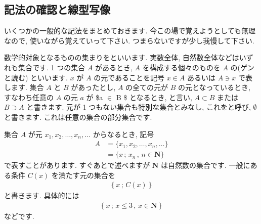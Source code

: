 \documentclass[openany, a4paper, oneside]{book}
\theoremstyle{break}
\theoremstyle{breakdefn}
\begin{document}
\subsection{記法の確認と線型写像}
\label{sec-4-3-2-2}

いくつかの一般的な記法をまとめておきます.
今この場で覚えようとしても無理なので, 使いながら覚えていって下さい.
つまらないですが少し我慢して下さい.

数学的対象となるものの集まりをといいます.
実数全体, 自然数全体などはいずれも集合です. 1 つの集合 $A$ があるとき,
 $A$ を構成する個々のものを $A$ の(ゲンと読む) といいます.
 $x$ が $A$ の元であることを記号 $x\in A$ あるいは $A\ni x$ で表します.
集合 $A$ と $B$ があったとし,  $A$ の全ての元が $B$ の元となっているとき, すなわち任意の $A$ の元 $a$ が \$a $\in$ B \$ となるとき,
と言い,  $A \subset B$ または $B\supset A$ と書きます.
元が 1 つもない集合も特別な集合とみなし, これをと呼び,  $\emptyset$ と書きます.
これは任意の集合の部分集合です.


集合 $A$ が元 $x_{1},x_{2},\dots,x_{n},\dots$ からなるとき, 記号
    \begin{align}
        A &= \{ x_{1},x_{2},\dots,x_{n},\dots \}  \\
        &= \{ x \, ; \, x_{n}\, , \, n\in \bm{N} \}
    \end{align}
で表すことがあります. すぐあとで述べますが $\bm{N}$ は自然数の集合です.
一般にある条件 $C (x)$ を満たす元の集合を
    \begin{align}
        \left \{ x \, ; \, C (x) \right \}
    \end{align}
と書きます. 具体的には
    \begin{align}
        \left \{ x \, ; \, x \leq 3\, , \, x \in \bm{N} \right \}
    \end{align}
などです.
\end{document}
